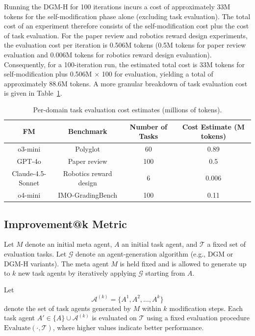 Running the DGM-H for 100 iterations incurs a cost of approximately 33M tokens for the self-modification phase alone (excluding task evaluation). The total cost of an experiment therefore consists of the self-modification cost plus the cost of task evaluation. For the paper review and robotics reward design experiments, the evaluation cost per iteration is 0.506M tokens (0.5M tokens for paper review evaluation and 0.006M tokens for robotics reward design evaluation). Consequently, for a 100-iteration run, the estimated total cost is 33M tokens for self-modification plus 0.506M $\times$ 100 for evaluation, yielding a total of approximately 88.6M tokens. A more granular breakdown of task evaluation cost is given in Table~\ref{tab:cost-detail}.

\begin{table}[H]
\centering
\begin{tabular}{@{}cccc@{}}
\toprule
\textbf{FM} & \textbf{Benchmark} & \textbf{Number of Tasks} & \textbf{Cost Estimate (M tokens)} \\ \midrule
o3-mini & Polyglot & 60 & 0.89 \\
GPT-4o & Paper review & 100 & 0.5 \\
Claude-4.5-Sonnet & Robotics reward design & 6 & 0.006 \\
o4-mini & IMO-GradingBench & 100 & 0.11 \\ \bottomrule
\end{tabular}
\caption[Per-domain task evaluation cost estimates]{Per-domain task evaluation cost estimates (millions of tokens).}
\label{tab:cost-detail}
\end{table}

\subsection{Improvement@k Metric}
\label{app:genk-metric}

Let $M$ denote an initial meta agent, $A$ an initial task agent, and $\mathcal{T}$ a fixed set of evaluation tasks. Let $\mathcal{G}$ denote an agent-generation algorithm (e.g., DGM or DGM-H variants). The meta agent $M$ is held fixed and is allowed to generate up to $k$ new task agents by iteratively applying $\mathcal{G}$ starting from $A$.

Let
\[
\mathcal{A}^{(k)} = \{A^{1}, A^{2}, \dots, A^{k}\}
\]
denote the set of task agents generated by $M$ within $k$ modification steps. Each task agent
$A' \in \{A\} \cup \mathcal{A}^{(k)}$ is evaluated on $\mathcal{T}$ using a fixed evaluation
procedure $\mathrm{Evaluate}(\cdot, \mathcal{T})$, where higher values indicate better performance.

